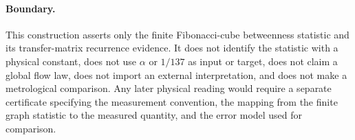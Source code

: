 \paragraph{Boundary.}
This construction asserts only the finite Fibonacci-cube betweenness statistic and its transfer-matrix recurrence evidence. It does not identify the statistic with a physical constant, does not use $\alpha$ or $1/137$ as input or target, does not claim a global flow law, does not import an external interpretation, and does not make a metrological comparison. Any later physical reading would require a separate certificate specifying the measurement convention, the mapping from the finite graph statistic to the measured quantity, and the error model used for comparison.
